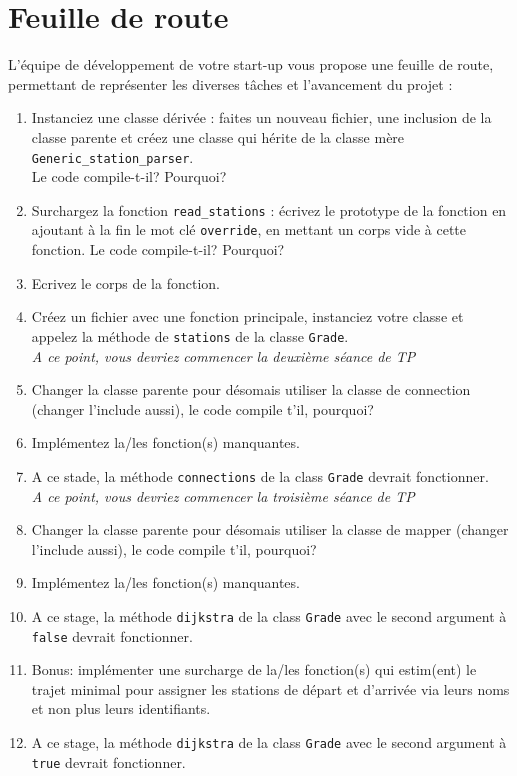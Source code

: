 \documentclass[9pts]{article}
\begin{document}
\section{Feuille de route}
\label{sec::feuille}
L'équipe de développement de votre start-up vous propose une feuille de route, permettant de représenter les diverses tâches et l'avancement du projet :

\begin{enumerate}
\item Instanciez une classe dérivée : faites un nouveau fichier, une inclusion de la classe parente et créez une classe qui hérite de la classe mère \texttt{Generic\_station\_parser}.\\
Le code compile-t-il? Pourquoi?
\item Surchargez la fonction \texttt{read\_stations} : écrivez le prototype de la fonction en ajoutant à la fin le mot clé \texttt{override}, en mettant un corps vide à cette fonction.
Le code compile-t-il? Pourquoi?
\item Ecrivez le corps de la fonction.
\item Créez un fichier avec une fonction principale, instanciez votre classe et appelez la méthode de \texttt{stations} de la classe \texttt{Grade}.\\

\emph{A ce point, vous devriez commencer la deuxième séance de TP}
\item Changer la classe parente pour désomais utiliser la classe de connection (changer l'include aussi), le code compile t'il, pourquoi?
\item Implémentez la/les fonction(s) manquantes.
\item A ce stade, la méthode \texttt{connections} de la class \texttt{Grade} devrait fonctionner.\\

\emph{A ce point, vous devriez commencer la troisième séance de TP}
\item Changer la classe parente pour désomais utiliser la classe de mapper (changer l'include aussi), le code compile t'il, pourquoi?
\item Implémentez la/les fonction(s) manquantes.
\item A ce stage, la méthode \texttt{dijkstra} de la class \texttt{Grade} avec le second argument à \texttt{false} devrait fonctionner.
\item Bonus: implémenter une surcharge de la/les fonction(s) qui estim(ent) le trajet minimal pour assigner les stations de départ et d'arrivée via leurs noms et non plus leurs identifiants.
\item A ce stage, la méthode \texttt{dijkstra} de la class \texttt{Grade} avec le second argument à \texttt{true} devrait fonctionner.
\end{enumerate}



\end{document}
